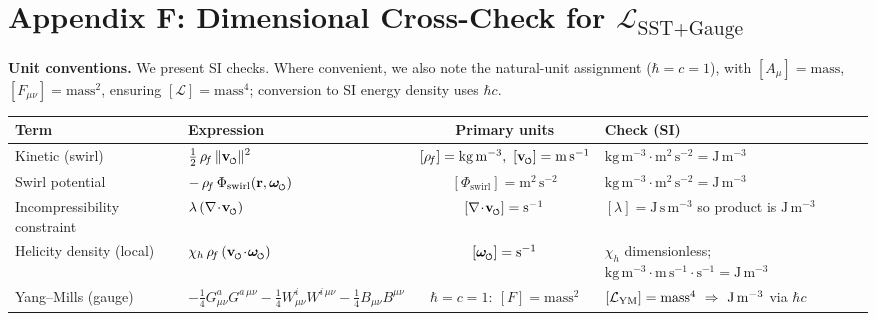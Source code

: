 \documentclass[11pt]{article}
\newcommand{\GsA}{G^a_{\mu\nu}}
\newcommand{\WsI}{W^i_{\mu\nu}}
\newcommand{\Bmn}{B_{\mu\nu}}
\newcommand{\swirlarrow}{%
     \mathchoice{\mkern-2mu\scriptstyle\boldsymbol{\circlearrowleft}}%
                {\mkern-2mu\scriptstyle\boldsymbol{\circlearrowleft}}%
                {\mkern-2mu\scriptscriptstyle\boldsymbol{\circlearrowleft}}%
                {\mkern-2mu\scriptscriptstyle\boldsymbol{\circlearrowleft}}%
}
\newcommand{\vswirl}{\mathbf{v}_{\swirlarrow}}
\newcommand{\omegas}{\boldsymbol{\omega}_{\swirlarrow}}  %
\newcommand{\rhof}{\rho_{\!f}}                           %
\begin{document}
\section*{Appendix F: Dimensional Cross-Check for \texorpdfstring{$\mathcal L_{\text{SST+Gauge}}$}{L\_\{SST+Gauge\}}}
\label{app:dim-check}

\noindent\textbf{Unit conventions.}
We present SI checks. Where convenient, we also note the natural-unit assignment
($\hbar=c=1$), with \([A_\mu]=\text{mass}\), \([F_{\mu\nu}]=\text{mass}^2\), ensuring \([\mathcal L]=\text{mass}^4\);
conversion to SI energy density uses \(\hbar c\).

\begin{center}
	\renewcommand{\arraystretch}{1.2}
	\begin{tabular}{@{}llcl@{}}
		\toprule
		\textbf{Term} & \textbf{Expression} & \textbf{Primary units} & \textbf{Check (SI)} \\
		\midrule
		Kinetic (swirl) &
		$\displaystyle \tfrac12\,\rhof\,\|\vswirl\|^2$ &
		$[\rhof]=\mathrm{kg\,m^{-3}},\ [\vswirl]=\mathrm{m\,s^{-1}}$ &
		$\mathrm{kg\,m^{-3}}\cdot \mathrm{m^2\,s^{-2}}=\mathrm{J\,m^{-3}}$ \\

		Swirl potential &
		$\displaystyle -\,\rhof\,\Phi_{\text{swirl}}(\mathbf r,\omegas)$ &
		$[\Phi_{\text{swirl}}]=\mathrm{m^2\,s^{-2}}$ &
		$\mathrm{kg\,m^{-3}}\cdot \mathrm{m^2\,s^{-2}}=\mathrm{J\,m^{-3}}$ \\

		Incompressibility constraint &
		$\displaystyle \lambda\,(\nabla\!\cdot\!\vswirl)$ &
		$[\nabla\!\cdot\!\vswirl]=\mathrm{s^{-1}}$ &
		$[\lambda]=\mathrm{J\,s\,m^{-3}}$ so product is $\mathrm{J\,m^{-3}}$ \\

		Helicity density (local) &
		$\displaystyle \chi_h\,\rhof\,(\vswirl\!\cdot\!\omegas)$ &
		$[\omegas]=\mathrm{s^{-1}}$ &
		$\chi_h$ dimensionless; $\mathrm{kg\,m^{-3}}\cdot \mathrm{m\,s^{-1}}\cdot \mathrm{s^{-1}}=\mathrm{J\,m^{-3}}$ \\

		Yang--Mills (gauge) &
		$\displaystyle -\tfrac14 \GsA G^{a\,\mu\nu}
		-\tfrac14 \WsI W^{i\,\mu\nu}
		-\tfrac14 \Bmn B^{\mu\nu}$ &
		$\hbar=c=1:\ [F]=\text{mass}^2$ &
		$[\mathcal L_{\rm YM}]=\text{mass}^4\ \Rightarrow\ \mathrm{J\,m^{-3}}$ via $\hbar c$ \\


\end{tabular}
\end{center}
\end{document}
